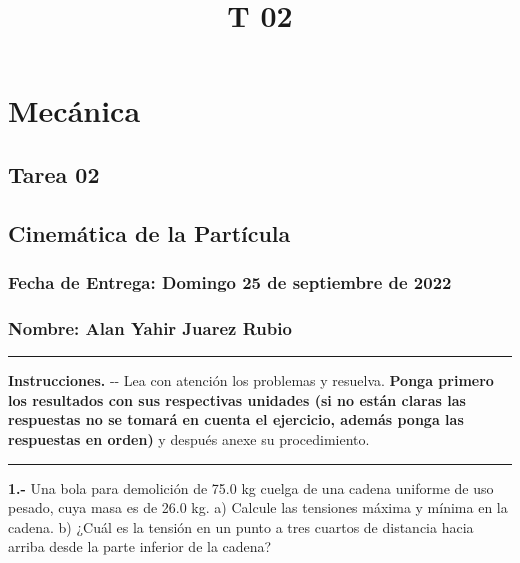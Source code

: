 \documentclass[
]{article}
\title{T 02}
\author{}
\date{}
\begin{document}
\maketitle

\hypertarget{mecuxe1nica}{%
\section{Mecánica}\label{mecuxe1nica}}

\hypertarget{tarea-02}{%
\subsection{Tarea 02}\label{tarea-02}}

\hypertarget{cinemuxe1tica-de-la-partuxedcula}{%
\subsection{Cinemática de la
Partícula}\label{cinemuxe1tica-de-la-partuxedcula}}

\hypertarget{fecha-de-entrega-domingo-25-de-septiembre-de-2022}{%
\subsubsection{Fecha de Entrega: Domingo 25 de septiembre de
2022}\label{fecha-de-entrega-domingo-25-de-septiembre-de-2022}}

\hypertarget{nombre-alan-yahir-juarez-rubio}{%
\subsubsection{Nombre: Alan Yahir Juarez
Rubio}\label{nombre-alan-yahir-juarez-rubio}}

\begin{center}\rule{0.5\linewidth}{0.5pt}\end{center}

\textbf{Instrucciones.} -\/- Lea con atención los problemas y resuelva.
\textbf{Ponga primero los resultados con sus respectivas unidades (si no
están claras las respuestas no se tomará en cuenta el ejercicio, además
ponga las respuestas en orden)} y después anexe su procedimiento.

\begin{center}\rule{0.5\linewidth}{0.5pt}\end{center}

\textbf{1.-} Una bola para demolición de 75.0 kg cuelga de una cadena
uniforme de uso pesado, cuya masa es de 26.0 kg. a) Calcule las
tensiones máxima y mínima en la cadena. b) ¿Cuál es la tensión en un
punto a tres cuartos de distancia hacia arriba desde la parte inferior
de la cadena?
\end{document}
